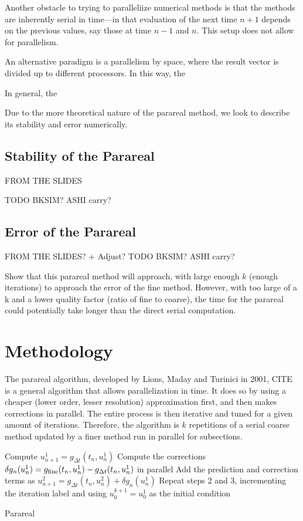 \documentclass[letterpaper,11pt]{article}
\begin{document}
Another obstacle to trying to paralleliize numerical methods is that the methods
are inherently serial in time---in that evaluation of the next time $n+1$
depends on the previous values, say those at time $n-1$ and $n$. This setup
does not allow for parallelism.

 An alternative paradigm is a parallelism by space, where the result vector is
 divided up to different processors.  In this way, the 

In general, the

Due to the more theoretical nature of the parareal method, we look to describe
its stability and error numerically.

\subsection{Stability of the Parareal}

FROM THE SLIDES 

TODO BKSIM? ASHI carry?

\subsection{Error of the Parareal}

FROM THE SLIDES? + Adjust?
TODO BKSIM? ASHI carry?

Show that this parareal method will approach, with large enough $k$ (enough
iterations) to approach the error of the fine method. However, with too large
of a k and a lower quality factor (ratio of fine to coarse), the time for the
parareal could potentially take longer than the direct serial computation.

\section{Methodology}

The parareal algorithm, developed by Lions, Maday and Turinici in 2001, CITE is
a general algorithm that allows parallelization in time.  It does so by using a
cheaper (lower order, lesser resolution) approximation first, and then makes
corrections in parallel. The entire process is then iterative and tuned for a
given amount of iterations. Therefore, the algorithm is $k$ repetitions of a
serial coarse method updated by a finer method run in parallel for subsections.

\begin{algorithm}[t]
    Compute $u^1_{n+1} = g_{\Delta t}(t_n, u^1_n)$\;
    Compute the corrections $\delta g_n(u^1_n) = g_{\textnormal{fine}}(t_n,
    u^1_n) - g_{\Delta t}(t_n, u^1_n)$ in parallel\;
    Add the prediction and correction terms as $u^2_{n+1} = g_{\Delta t}(t_n,
    u^2_n) + \delta g_n(u^1_n)$\;
    Repeat steps 2 and 3, incrementing the iteration label and using $u^{k+1}_0
    = u^1_0$ as the initial condition\;
 \caption{Parareal}
 \label{alg:parareal}
\end{algorithm}
\end{document}
